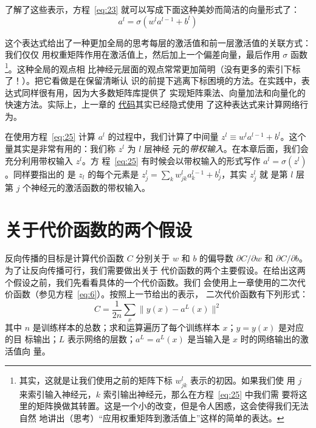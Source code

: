 了解了这些表示，方程~\eqref{eq:23} 就可以写成下面这种美妙而简洁的向量形式了：
\begin{equation}
  a^{l} = \sigma(w^l a^{l-1}+b^l)
  \label{eq:25}\tag{25}
\end{equation}

这个表达式给出了一种更加全局的思考每层的激活值和前一层激活值的关联方式：我们仅仅
用权重矩阵作用在激活值上，然后加上一个偏差向量，最后作用 $\sigma$ 函数
\footnote{其实，这就是让我们使用之前的矩阵下标 $w_{jk}^l$ 表示的初因。如果我们使
  用 $j$ 来索引输入神经元，$k$ 索引输出神经元，那么在方程~\eqref{eq:25} 中我们需
  要将这里的矩阵换做其转置。这是一个小的改变，但是令人困惑，这会使得我们无法自然
  地讲出（思考）``应用权重矩阵到激活值上''这样的简单的表达。}。这种全局的观点相
比神经元层面的观点常常更加简明（没有更多的索引下标了！）。把它看做是在保留清晰认
识的前提下逃离下标困境的方法。在实践中，表达式同样很有用，因为大多数矩阵库提供了
实现矩阵乘法、向量加法和向量化的快速方法。实际上，上一章的%
\hyperref[sec:implementing_our_network_to_classify_digits]{代码}其实已经隐式使用
了这种表达式来计算网络行为。

在使用方程~\eqref{eq:25} 计算 $a^l$ 的过程中，我们计算了中间量
$z^l \equiv w^l a^{l-1}+b^l$。这个量其实是非常有用的：我们称 $z^l$ 为 $l$ 层神经
元的\emph{带权输入}。在本章后面，我们会充分利用带权输入 $z^l$。方
程~\eqref{eq:25} 有时候会以带权输入的形式写作 $a^l = \sigma(z^l)$。同样要指出的
是 $z_l$ 的每个元素是 $z^l_j = \sum_k w^l_{jk} a^{l-1}_k+b^l_j$，其实 $z^l_j$ 就
是第 $l$ 层第 $j$ 个神经元的激活函数的带权输入。

\section{关于代价函数的两个假设}
\label{sec:TwoAssumptionsWeNeedAboutTheCostFunction}

反向传播的目标是计算代价函数 $C$ 分别关于 $w$ 和 $b$ 的偏导数 $\partial
C/\partial w$ 和 $\partial C / \partial b$。为了让反向传播可行，我们需要做出关于
代价函数的两个主要假设。在给出这两个假设之前，我们先看看具体的一个代价函数。我们
会使用上一章使用的二次代价函数（参见方程~\eqref{eq:6}）。按照上一节给出的表示，
二次代价函数有下列形式：
\begin{equation}
  C = \frac{1}{2n} \sum_x \|y(x)-a^L(x)\|^2
  \label{eq:26}\tag{26}
\end{equation}
其中 $n$ 是训练样本的总数；求和运算遍历了每个训练样本 $x$；$y = y(x)$ 是对应的目
标输出；$L$ 表示网络的层数；$a^L = a^L(x)$ 是当输入是 $x$ 时的网络输出的激活值向
量。

